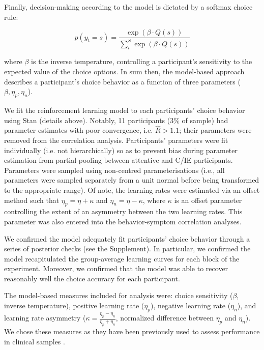 \documentclass[a4paper,notitlepage,12pt]{article}
\begin{document}
Finally, decision-making according to the model is dictated by a softmax choice rule:

\begin{equation*}
    p(y_t = s) = \frac{\exp \left( \beta \cdot Q(s) \right)}{\sum_i^S \exp \left( \beta \cdot Q(s) \right)}
\end{equation*}

where $\beta$ is the inverse temperature, controlling a participant's sensitivity to the expected value of the choice options. In sum then, the model-based approach describes a participant's choice behavior as a function of three parameters ($\beta, \eta_p, \eta_n$). 

We fit the reinforcement learning model to each participants' choice behavior using Stan (details above). Notably, 11 participants (3\% of sample) had parameter estimates with poor convergence, i.e. $\hat{R} > 1.1$; their parameters were removed from the correlation analysis. Participants' parameters were fit individually (i.e. not hierarchically) so as to prevent bias during parameter estimation from partial-pooling between attentive and C/IE participants. Parameters were sampled using non-centred parameterisations (i.e., all parameters were sampled separately from a unit normal before being transformed to the appropriate range). Of note, the learning rates were estimated via an offset method such that $\eta_p = \eta + \kappa$ and $\eta_n = \eta - \kappa$, where $\kappa$ is an offset parameter controlling the extent of an asymmetry between the two learning rates. This parameter was also entered into the behavior-symptom correlation analyses. 

We confirmed the model adequately fit participants' choice behavior through a series of posterior checks (see the Supplement). In particular, we confirmed the model recapitulated the group-average learning curves for each block of the experiment. Moreover, we confirmed that the model was able to recover reasonably well the choice accuracy for each participant.

The model-based measures included for analysis were: choice sensitivity ($\beta$,  inverse temperature), positive learning rate ($\eta_p$), negative learning rate ($\eta_n$), and learning rate asymmetry ($\kappa = \frac{\eta_p-\eta_n}{\eta_p+\eta_n}$, normalized difference between $\eta_p$ and $\eta_n$). We chose these measures as they have been previously used to assess performance in clinical samples \cite{huang2017computational, brolsma2020challenging, mukherjee_reward_2020, ritschel2017neural}. 
\end{document}
